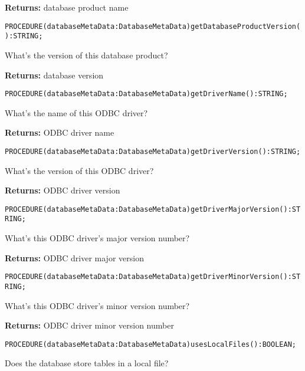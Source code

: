 {\bf Returns: } 
database product name 




\verb'PROCEDURE(databaseMetaData:DatabaseMetaData)getDatabaseProductVersion():STRING;'






What's the version of this database product? 


{\bf Returns: } 
database version 




\verb'PROCEDURE(databaseMetaData:DatabaseMetaData)getDriverName():STRING;'






What's the name of this ODBC driver? 


{\bf Returns: } 
ODBC driver name 




\verb'PROCEDURE(databaseMetaData:DatabaseMetaData)getDriverVersion():STRING;'






What's the version of this ODBC driver? 


{\bf Returns: } 
ODBC driver version 




\verb'PROCEDURE(databaseMetaData:DatabaseMetaData)getDriverMajorVersion():STRING;'






What's this ODBC driver's major version number? 


{\bf Returns: } 
ODBC driver major version 




\verb'PROCEDURE(databaseMetaData:DatabaseMetaData)getDriverMinorVersion():STRING;'






What's this ODBC driver's minor version number? 


{\bf Returns: } 
ODBC driver minor version number 




\verb'PROCEDURE(databaseMetaData:DatabaseMetaData)usesLocalFiles():BOOLEAN;'






Does the database store tables in a local file? 


